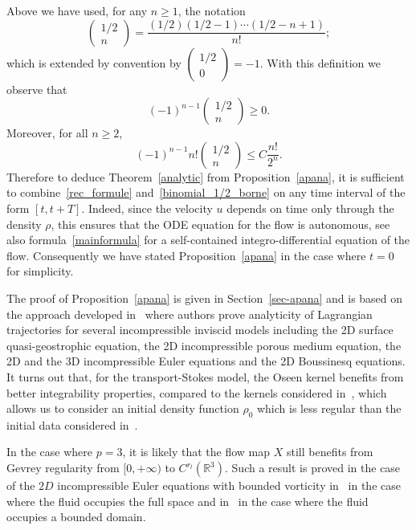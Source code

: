 \documentclass[AHL,Unicode,longabstracts,published]{cedram}
\newcommand{\R}{\mathbb{R}}
\renewcommand{\leq}{\leqslant}
\renewcommand{\geq}{\geqslant}
\begin{document}
Above we have used, for any $n\geq 1$, the notation
\begin{equation}\label{binomial_1/2}
\begin{pmatrix}
1/2\\
n
\end{pmatrix}= \frac{(1/2)(1/2-1) \cdots (1/2-n+1)}{n!};
\end{equation}
which is extended by convention by $
(\begin{smallmatrix}
1/2\\0
\end{smallmatrix})=-1$. With this definition we observe that
\[
(-1)^{n-1}
\begin{pmatrix}
1/2\\n
\end{pmatrix}\geq 0.
\]
Moreover, for all $n\geq 2$,
\begin{equation}\label{binomial_1/2_borne}
(-1)^{n-1} n!
\begin{pmatrix}
1/2\\n
\end{pmatrix} \leq C \frac{n!}{2^n}.
\end{equation}
Therefore to deduce Theorem~\ref{analytic} from Proposition~\ref{apana}, it is sufficient to combine~\eqref{rec_formule} and~\eqref{binomial_1/2_borne} on any time interval of the form $[t,t+T] $. Indeed, since the velocity $u$ depends on time only through the density $\rho$, this ensures that the ODE equation for the flow is autonomous, see also formula~\eqref{mainformula} for a self-contained integro-differential equation of the flow. Consequently we have stated Proposition~\ref{apana} in the case where $t=0$ for simplicity.

The proof of Proposition~\ref{apana} is given in Section~\ref{sec-apana} and is based on the approach developed in~\cite{CVW} where authors prove analyticity of Lagrangian trajectories for several incompressible inviscid models including the 2D surface quasi-geostrophic equation, the 2D incompressible porous medium equation, the 2D and the 3D incompressible Euler equations and the 2D Boussinesq equations. It turns out that, for the transport-Stokes model, the Oseen kernel benefits from better integrability properties, compared to the kernels considered in~\cite{CVW}, which allows us to consider an initial density function $\rho_0$ which is less regular than the initial data considered in~\cite{CVW}.

\begin{rema}\label{G3}
In the case where $p=3$, it is likely that the flow map $X$ still benefits from Gevrey regularity from $[0,+\infty)$ to $C^{r_t}(\R^3)$. Such a result is proved in the case of the $2D$ incompressible Euler equations with bounded vorticity in~\cite{Gamblin} in the case where the fluid occupies the full space and in~\cite{Sueur} in the case where the fluid occupies a bounded domain.
\end{rema}
\end{document}
